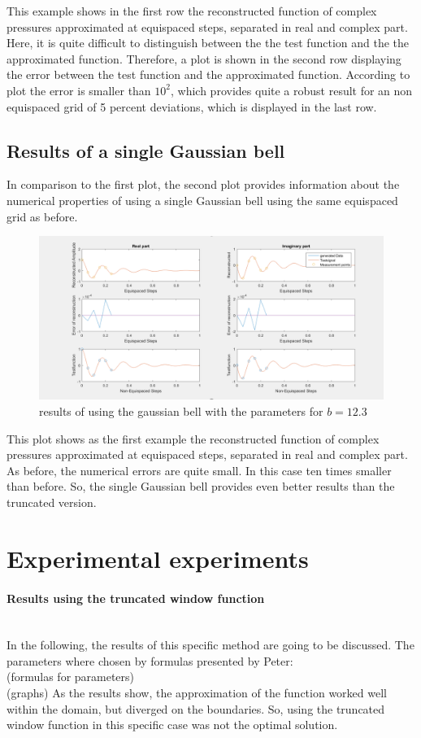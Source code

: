 \documentclass[11pt]{report} %
\begin{document}
This example shows in the first row the reconstructed function of complex pressures approximated at equispaced steps, separated in real and complex part. 
Here, it is quite difficult to distinguish between the the test function and the the approximated function. 
Therefore, a plot is shown in the second row displaying the error between the test function and the approximated function. 
According to plot the error is smaller than $10^2$, which provides quite a robust result for an non equispaced grid of 5 percent deviations, which is displayed in the last row.


\subsection{Results of a single Gaussian bell}
In comparison to the first plot, the second plot provides information about the numerical properties of using a single Gaussian bell using the same equispaced grid as before.

\begin{figure}[H]
\centering
\includegraphics[scale=1]{./Figures/plot_trunc}
\caption{results of using the gaussian bell with the parameters for $b=12.3$}
\end{figure}

This plot shows as the first example the reconstructed function of complex pressures approximated at equispaced steps, separated in real and complex part.
As before, the numerical errors are quite small.
In this case ten times smaller than before. 
So, the single Gaussian bell provides even better results than the truncated version. 


\section{Experimental experiments}
\paragraph{Results using the truncated window function} $ $ \\[1ex]
In the following, the results of this specific method are going to be discussed.
The parameters where chosen by formulas presented by Peter: \\
	(formulas for parameters) \\
	(graphs)
As the results show, the approximation of the function worked well within the domain, but diverged on the boundaries.
So, using the truncated window function in this specific case was not the optimal solution. \\[1ex]
\end{document}
